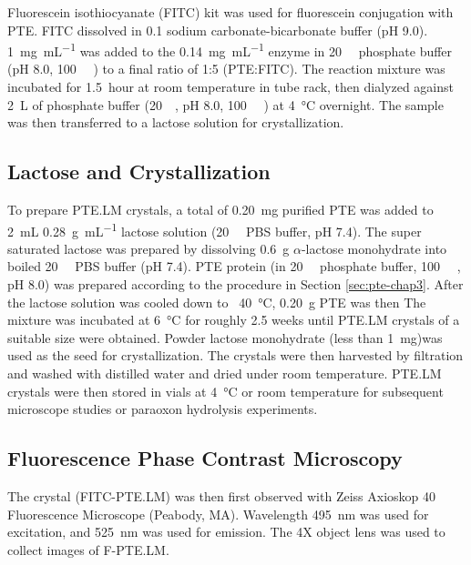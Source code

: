 \begin{refsection}
Fluorescein isothiocyanate (FITC) kit was used for fluorescein conjugation with
PTE. FITC dissolved in \SI{0.1}{\Molar} sodium carbonate-bicarbonate buffer (pH
9.0).  \SI{1}{\mg\per\mL} was added to the \SI{0.14}{\mg\per\mL} enzyme in
\SI{20}{\milli\Molar} phosphate buffer (pH 8.0, \SI{100}{\micro\Molar}
) to a final ratio of 1:5 (PTE:FITC). The reaction mixture was
incubated for \SI{1.5}{hour} at room temperature in tube rack, then dialyzed
against \SI{2}{\liter} of phosphate buffer (\SI{20}{\milli\Molar}, pH 8.0,
\SI{100}{\micro\Molar} ) at \SI{4}{\celsius} overnight.  The sample
was then transferred to a lactose solution for crystallization.

\subsection{Lactose and Crystallization}

To prepare PTE.LM crystals, a total of \SI{0.20}{\milli\gram} purified PTE was
added to \SI{2}{\mL} \SI{0.28}{\gram\per\mL} lactose solution
(\SI{20}{\milli\Molar} PBS buffer, pH 7.4). The super saturated lactose was
prepared by dissolving \SI{0.6}{\gram} $\alpha$-lactose monohydrate into boiled
\SI{20}{\milli\Molar} PBS buffer (pH 7.4). PTE protein (in
\SI{20}{\milli\Molar} phosphate buffer, \SI{100}{\micro\Molar} , pH
8.0) was prepared according to the procedure in Section \ref{sec:pte-chap3}.
After the lactose solution was cooled down to ~\SI{40}{\celsius},
\SI{0.20}{\gram} PTE was then The mixture was incubated at \SI{6}{\celsius} for
roughly 2.5 weeks until PTE.LM crystals of a suitable size were obtained.
Powder lactose monohydrate (less than \SI{1}{\mg})was used as the seed for
crystallization. The crystals were then harvested by filtration and washed with
distilled water and dried under room temperature. PTE.LM crystals were then
stored in vials at \SI{4}{\celsius} or room temperature for subsequent
microscope studies or paraoxon hydrolysis experiments.

\subsection{Fluorescence Phase Contrast Microscopy}

The crystal (FITC-PTE.LM) was then first observed with Zeiss Axioskop 40
Fluorescence Microscope (Peabody, MA).  Wavelength \SI{495}{\nm} was used for
excitation, and \SI{525}{\nm} was used for emission. The 4X object lens was used to
collect images of F-PTE.LM.


\end{refsection}
